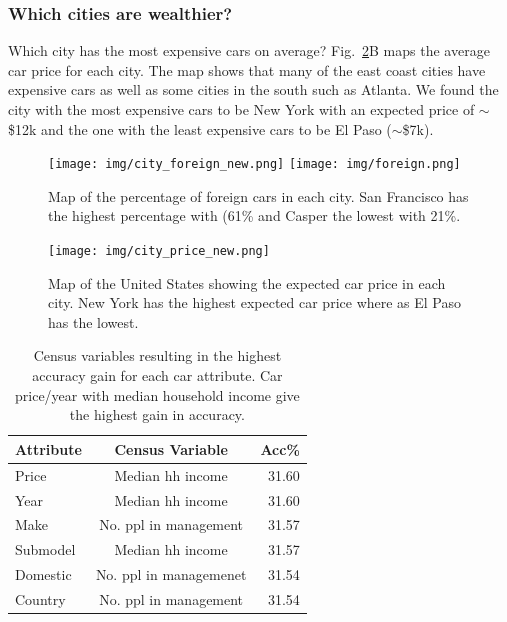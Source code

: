 \documentclass[10pt,twocolumn,letterpaper]{article}
\begin{document}
\subsubsection{Which cities are wealthier?}
Which city has the most expensive cars on average? Fig.~\ref{fig:city_price}B maps the average car price for each city. The map shows that many of the east coast cities have expensive cars as well as some cities in the south such as Atlanta. We found the city with the most expensive cars to be New York with an expected price of \(\sim\)\$12k and the one with the least expensive cars to be El Paso (\(\sim\)\$7k). 

\begin{figure}[t]
\begin{center}
    \texttt{[image: img/city\_foreign\_new.png]}
    \texttt{[image: img/foreign.png]}
\end{center}
   \caption {Map of the percentage of foreign cars in each city. San Francisco has the highest percentage with (61\% and Casper the lowest with 21\%.} 
\label{fig:city_price}
\end{figure}

\begin{figure}[t]
\begin{center}
    \texttt{[image: img/city\_price\_new.png]}
\end{center}
   \caption {Map of the United States showing the expected car price in each city. New York has the highest expected car price where as El Paso has the lowest.}
\label{fig:city_price}
\end{figure}

\begin{table}
\begin{center}
\begin{tabular}{|l|c|r|}
\hline
\textbf{Attribute} & \textbf{Census Variable}& \textbf{Acc\%}\\
\hline\hline
Price & Median hh income & 31.60\\
Year  & Median hh income & 31.60\\
Make & No. ppl in management & 31.57\\
Submodel & Median hh income & 31.57\\
Domestic & No. ppl in managemenet & 31.54\\
Country & No. ppl in management & 31.54\\
\hline
\end{tabular}
\end{center}
\caption{Census variables resulting in the highest accuracy gain for each car attribute. Car price/year with median household income give the highest gain in accuracy.}
\label{table:prior-acc}
\end{table}
\end{document}
